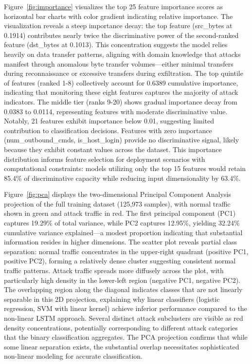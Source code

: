 \documentclass[12pt,a4paper]{report}
\begin{document}
Figure~\ref{fig:importance} visualizes the top 25 feature importance scores as horizontal bar charts with color gradient indicating relative importance. The visualization reveals a steep importance decay: the top feature (src\_bytes at 0.1914) contributes nearly twice the discriminative power of the second-ranked feature (dst\_bytes at 0.1013). This concentration suggests the model relies heavily on data transfer patterns, aligning with domain knowledge that attacks manifest through anomalous byte transfer volumes---either minimal transfers during reconnaissance or excessive transfers during exfiltration. The top quintile of features (ranked 1-8) collectively account for 0.6389 cumulative importance, indicating that monitoring these eight features captures the majority of attack indicators. The middle tier (ranks 9-20) shows gradual importance decay from 0.0383 to 0.0114, representing features with moderate discriminative value. Notably, 21 features exhibit importance below 0.01, suggesting limited contribution to classification decisions. Features with zero importance (num\_outbound\_cmds, is\_host\_login) provide no discriminative signal, likely because they exhibit constant values across the dataset. This importance distribution informs feature selection for deployment scenarios with computational constraints: models utilizing only the top 15 features would retain 85.4\% of discriminative capacity while reducing input dimensionality by 63.4\%.

Figure~\ref{fig:pca} displays the two-dimensional Principal Component Analysis projection of the full training dataset (125,973 samples), with normal traffic shown in green and attack traffic in red. The first principal component (PC1) captures 19.29\% of total variance, while PC2 captures 12.95\%, yielding 32.24\% cumulative variance explained---a modest proportion indicating that substantial information resides in higher dimensions. The scatter plot reveals partial class separation: normal traffic concentrates in the upper-right quadrant (positive PC1, positive PC2), forming a relatively dense cluster suggesting consistent normal traffic patterns. Attack traffic spreads more diffusely across the plot, with particularly high density in the lower-left region (negative PC1, negative PC2). The overlapping region along the diagonal indicates classes that are not linearly separable in this 2D projection, explaining why linear classifiers (logistic regression, SVM with linear kernel) achieve inferior performance compared to the non-linear LSTM approach. Several distinct attack subclusters are visible as red density concentrations, potentially corresponding to different attack categories that the binary classification aggregates. The PCA projection confirms that while some linear separation exists, the substantial overlap necessitates sophisticated non-linear modeling for accurate classification.
\end{document}

